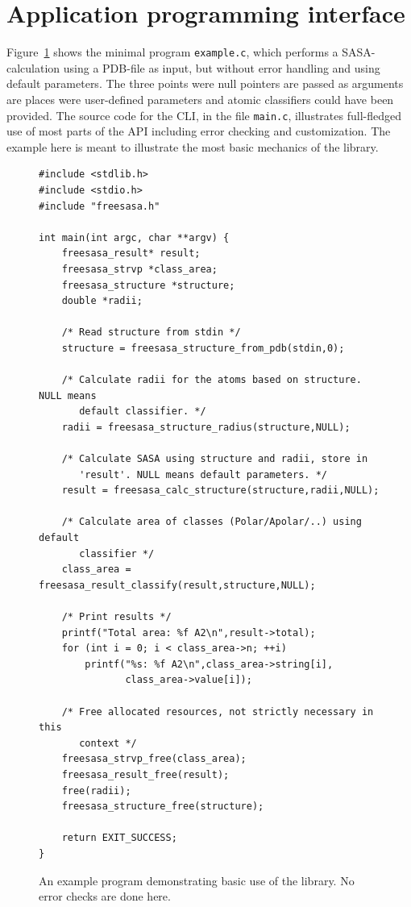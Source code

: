 \documentclass[a4paper,11pt]{article}
\begin{document}
\section{Application programming interface}\label{sec:api}

Figure~\ref{fig:example_c} shows the minimal program \verb|example.c|,
which performs a SASA-calculation using a PDB-file as input, but
without error handling and using default parameters. The three points
were null pointers are passed as arguments are places were
user-defined parameters and atomic classifiers could have been
provided. The source code for the CLI, in the file \verb|main.c|,
illustrates full-fledged use of most parts of the API including error
checking and customization. The example here is meant to illustrate
the most basic mechanics of the library.

\begin{figure}
  \begin{Verbatim}[frame=single,fontsize=\footnotesize,framesep=5mm]
#include <stdlib.h>
#include <stdio.h>
#include "freesasa.h"

int main(int argc, char **argv) {
    freesasa_result* result;
    freesasa_strvp *class_area;
    freesasa_structure *structure;
    double *radii;

    /* Read structure from stdin */
    structure = freesasa_structure_from_pdb(stdin,0);

    /* Calculate radii for the atoms based on structure.  NULL means
       default classifier. */
    radii = freesasa_structure_radius(structure,NULL);

    /* Calculate SASA using structure and radii, store in
       'result'. NULL means default parameters. */
    result = freesasa_calc_structure(structure,radii,NULL);
    
    /* Calculate area of classes (Polar/Apolar/..) using default
       classifier */
    class_area = freesasa_result_classify(result,structure,NULL);

    /* Print results */
    printf("Total area: %f A2\n",result->total);
    for (int i = 0; i < class_area->n; ++i)
        printf("%s: %f A2\n",class_area->string[i],
               class_area->value[i]);

    /* Free allocated resources, not strictly necessary in this
       context */
    freesasa_strvp_free(class_area);
    freesasa_result_free(result);
    free(radii);
    freesasa_structure_free(structure);

    return EXIT_SUCCESS;
}

  \end{Verbatim}
  \caption{An example program demonstrating basic use of the
    library. No error checks are done here. \label{fig:example_c}}
\end{figure}
\end{document}
